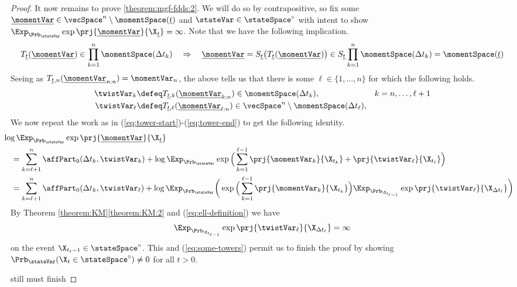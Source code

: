 \begin{proof}
  It now remains to prove \ref{theorem:mgf-fdds:2}.
  We will do so by contrapositive, so fix some $\underline\momentVar \in \vecSpace^n \setminus \momentSpace(\underline t)$ and $\stateVar \in \stateSpace^\circ$ with intent to show $\Exp_{\Prb_\stateVar}\exp\prj{\underline\momentVar}{\X_{\underline t}} = \infty$.
  Note that we have the following implication.
  \begin{equation}
    T_{\underline t}(\underline\momentVar) \in \prod_{k=1}^n\momentSpace(\Delta t_k) 
    \quad\Rightarrow\quad
    \underline\momentVar = S_{\underline t}\big(T_{\underline t}(\underline\momentVar)\big) \in S_{\underline t} \prod_{k=1}^n \momentSpace(\Delta t_k) = \momentSpace(\underline t)
  \end{equation}
  Seeing as $T_{\underline t,n}(\underline\momentVar_{n:n}) = \momentVar_n$, the above tells us that there is some $\ell \in \{1, \ldots, n\}$ for which the following holds.
  \begin{align}
    \twistVar_k &\defeq T_{\underline t, k}(\underline\momentVar_{k:n}) \in \momentSpace(\Delta t_k), & k = n, \ldots, \ell + 1 \\
    \twistVar_\ell &\defeq T_{\underline t,\ell}(\underline\momentVar_{\ell:n}) \in \vecSpace^n \setminus \momentSpace(\Delta t_\ell),
    \label{eq:ell-definition}
  \end{align}
  We now repeat the work as in (\ref{eq:tower-start})-(\ref{eq:tower-end}) to get the following identity.
  \begin{align}
    &\hspace{-1em}\log\Exp_{\Prb_\stateVar} \exp\prj{\underline\momentVar}{\X_{\underline t}} \tag*{} \\
    &= \sum_{k=\ell+1}^n \affPart_0(\Delta t_k, \twistVar_k) + \log\Exp_{\Prb_\stateVar}\exp\Big(\sum_{k=1}^{\ell-1} \prj{\momentVar_k}{\X_{t_k}} + \prj{\twistVar_\ell}{\X_{t_\ell}} \Big) \\
    &= \sum_{k=\ell+1}^n \affPart_0(\Delta t_k, \twistVar_\ell) + \log\Exp_{\Prb_\stateVar}\bigg(\exp\Big(\sum_{k=1}^{\ell-1} \prj{\momentVar_k}{\X_{t_k}} \Big) \Exp_{\Prb_{\X_{t_{\ell-1}}}} \exp\prj{\twistVar_\ell}{\X_{\Delta t_\ell}} \bigg)
    \label{eq:some-towers}
  \end{align}
  By Theorem \ref{theorem:KM}\ref{theorem:KM:2} and (\ref{eq:ell-definition}) we have
  \begin{equation}
    \Exp_{\Prb_{\X_{t_{\ell-1}}}}\exp\prj{\twistVar_\ell}{\X_{\Delta t_\ell}} = \infty
  \end{equation}
  on the event $\X_{t_\ell-1} \in \stateSpace^\circ$.
  This and (\ref{eq:some-towers}) permit us to finish the proof by showing $\Prb_\stateVar(\X_t \in \stateSpace^\circ) \neq 0$ for all $t > 0$.

  \color{red}
  still must finish
\end{proof}
